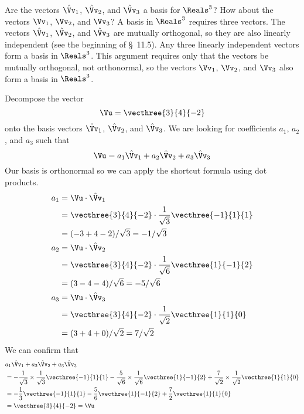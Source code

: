 \documentclass[12pt,ragged]{pajarticle}
\begin{document}
\begin{question}{4}{%
Are the vectors $\hat{\Vv}_1$, $\hat{\Vv}_2$, and $\hat{\Vv}_3$ a basis for $\Reals^3$? How about the vectors $\Vv_1$, $\Vv_2$, and $\Vv_3$?}{
A basis in $\Reals^3$ requires three vectors. The vectors $\hat{\Vv}_1$, $\hat{\Vv}_2$, and $\hat{\Vv}_3$ are mutually orthogonal, so they are also linearly independent (see the beginning of \S~11.5). Any three linearly independent vectors form a basis in $\Reals^3$. This argument requires only that the vectors be mutually orthogonal, not orthonormal, so the vectors $\Vv_1$, $\Vv_2$, and $\Vv_3$ also form a basis in $\Reals^3$.
}
\end{question}


\begin{question}{5}{%
Decompose the vector
\[ \Vu = \vecthree{3}{4}{-2} \]
onto the basis vectors $\hat{\Vv}_1$, $\hat{\Vv}_2$, and $\hat{\Vv}_3$.}{
We are looking for coefficients $a_1$, $a_2$, and $a_3$ such that
\[ \Vu = a_1\hat{\Vv}_1 + a_2\hat{\Vv}_2 + a_3\hat{\Vv}_3 \]
Our basis is orthonormal so we can apply the shortcut formula using dot products.
\begin{align*}
	a_1 &= \Vu\cdot\hat{\Vv}_1 \\
		&= \vecthree{3}{4}{-2}\cdot \frac{1}{\sqrt{3}}\vecthree{-1}{1}{1} \\
		&= (-3 + 4 - 2)/\sqrt{3} = -1/\sqrt{3} \\
	a_2 &= \Vu\cdot\hat{\Vv}_2 \\
		&= \vecthree{3}{4}{-2}\cdot \frac{1}{\sqrt{6}}\vecthree{1}{-1}{2} \\
		&= (3 - 4 - 4)/\sqrt{6} = -5/\sqrt{6} \\
	a_3 &= \Vu\cdot\hat{\Vv}_3 \\
		&= \vecthree{3}{4}{-2}\cdot \frac{1}{\sqrt{2}}\vecthree{1}{1}{0} \\
		&= (3 + 4 + 0)/\sqrt{2} = 7/\sqrt{2} \\
\end{align*}
We can confirm that
\begin{align*}
	&a_1\hat{\Vv}_1 + a_2\hat{\Vv}_2 + a_3\hat{\Vv}_3 \\
	&= -\frac{1}{\sqrt{3}} \times \frac{1}{\sqrt{3}} \vecthree{-1}{1}{1}   
		- \frac{5}{\sqrt{6}} \times \frac{1}{\sqrt{6}} \vecthree{1}{-1}{2} 
		+ \frac{7}{\sqrt{2}}\times\frac{1}{\sqrt{2}} \vecthree{1}{1}{0} \\
	&= 	-\frac{1}{3}\vecthree{-1}{1}{1} - \frac{5}{6}\vecthree{1}{-1}{2} + \frac{7}{2}\vecthree{1}{1}{0} \\
	&= \vecthree{3}{4}{-2} = \Vu
\end{align*}
}	
\end{question}
\end{document}
